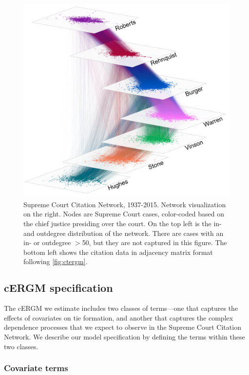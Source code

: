 \documentclass[headsepline=true, abstracton]{scrartcl}
\begin{document}
\begin{figure}[bt]
\begin{minipage}{.63\linewidth}
		\includegraphics[width = \textwidth]{courts_layer.png}
	\end{minipage}
	\caption{Supreme Court Citation Network, 1937-2015. Network visualization on the right. Nodes are Supreme Court cases, color-coded based on the chief justice presiding over the court. On the top left is the in- and outdegree distribution of the network. There are cases with an in- or outdegree  $>$50, but they are not captured in this figure. The bottom left shows the citation data in adjacency matrix format following \autoref{fig:ctergm}.}
	\label{degree_dist}
\end{figure}



\subsection{cERGM specification}

The cERGM we estimate includes two classes of terms---one that captures the effects of covariates on tie formation, and another that captures the complex dependence processes that we expect to observe in the Supreme Court Citation Network. We describe our model specification by defining the terms within these two classes.


\subsubsection{Covariate terms}\label{covariate_terms}
\end{document}

